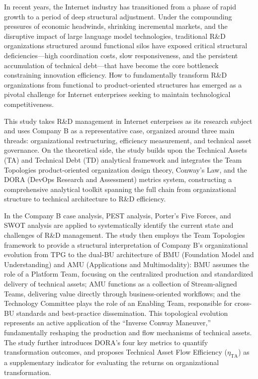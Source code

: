\begin{abstract*}
  In recent years, the Internet industry has transitioned from a phase of rapid growth to a period of deep structural adjustment. Under the compounding pressures of economic headwinds, shrinking incremental markets, and the disruptive impact of large language model technologies, traditional R\&D organizations structured around functional silos have exposed critical structural deficiencies—high coordination costs, slow responsiveness, and the persistent accumulation of technical debt—that have become the core bottleneck constraining innovation efficiency. How to fundamentally transform R\&D organizations from functional to product-oriented structures has emerged as a pivotal challenge for Internet enterprises seeking to maintain technological competitiveness.

  This study takes R\&D management in Internet enterprises as its research subject and uses Company B as a representative case, organized around three main threads: organizational restructuring, efficiency measurement, and technical asset governance. On the theoretical side, the study builds upon the Technical Assets (TA) and Technical Debt (TD) analytical framework and integrates the Team Topologies product-oriented organization design theory, Conway's Law, and the DORA (DevOps Research and Assessment) metrics system, constructing a comprehensive analytical toolkit spanning the full chain from organizational structure to technical architecture to R\&D efficiency.

  In the Company B case analysis, PEST analysis, Porter's Five Forces, and SWOT analysis are applied to systematically identify the current state and challenges of R\&D management. The study then employs the Team Topologies framework to provide a structural interpretation of Company B's organizational evolution from TPG to the dual-BU architecture of BMU (Foundation Model and Understanding) and AMU (Applications and Multimodality): BMU assumes the role of a Platform Team, focusing on the centralized production and standardized delivery of technical assets; AMU functions as a collection of Stream-aligned Teams, delivering value directly through business-oriented workflows; and the Technology Committee plays the role of an Enabling Team, responsible for cross-BU standards and best-practice dissemination. This topological evolution represents an active application of the ``Inverse Conway Maneuver,'' fundamentally reshaping the production and flow mechanisms of technical assets. The study further introduces DORA's four key metrics to quantify transformation outcomes, and proposes Technical Asset Flow Efficiency ($\eta_{\mathrm{TA}}$) as a supplementary indicator for evaluating the returns on organizational transformation.


\end{abstract*}
